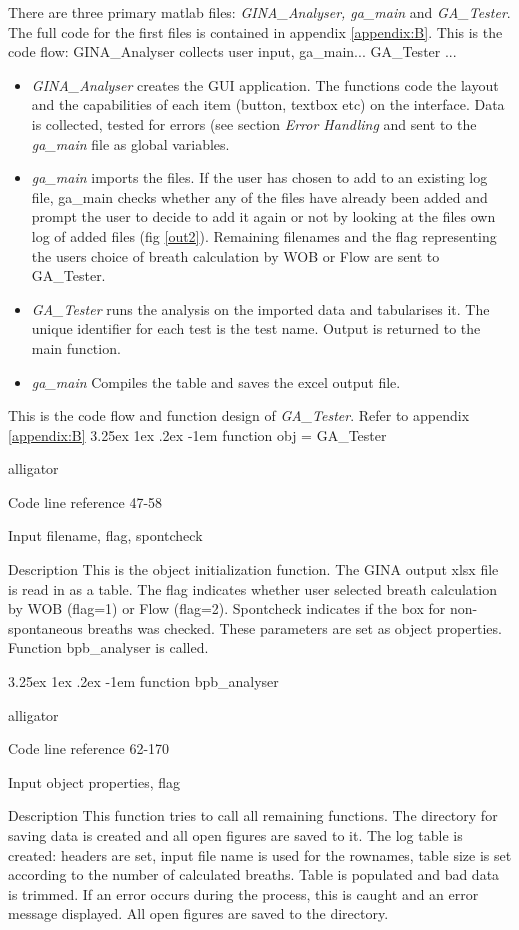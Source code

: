 \documentclass[12pt, openany, oneside]{book}
\makeatletter
\renewcommand\subparagraph{\@startsection{subparagraph}{6}{\parindent}%
  {3.25ex \@plus1ex \@minus .2ex}%
  {-1em}%
  {\normalfont\normalsize\bfseries}}
\makeatother
\begin{document}
There are three primary matlab files: \textit{GINA\_Analyser, ga\_main} and \textit{GA\_Tester}. The full code for the first files is contained in appendix \ref{appendix:B}.
This is the code flow: GINA\_Analyser collects user input, ga\_main... GA\_Tester ... 
\begin{itemize}
	\item \textit{GINA\_Analyser} creates the GUI application. The functions code the layout and the capabilities of each item (button, textbox etc) on the interface. 
Data is collected, tested for errors (see section \textit{Error Handling} and sent to the \textit{ga\_main} file as global variables. 
	\item \textit{ga\_main} imports the files. If the user has chosen to add to an existing log file, ga\_main checks whether any of the files have already been added and prompt the user to decide to add it again or not by looking at the files own log of added files (fig \ref{out2}). Remaining filenames and the flag representing the users choice of breath calculation by WOB or Flow are sent to GA\_Tester.
	\item	\textit{GA\_Tester} runs the analysis on the imported data and tabularises it. The unique identifier for each test is the test name. Output is returned to the main function.
\item \textit{ga\_main} Compiles the table and saves the excel output file. 
\end{itemize}



This is the code flow and function design of \textit{GA\_Tester}. Refer to appendix \ref{appendix:B}
\subparagraph{function obj = GA\_Tester}
\begin{labeling}{alligator}
\item[Code line reference] 47-58
\item[Input] filename, flag, spontcheck
\item[Description] This is the object initialization function. The GINA output xlsx file is read in as a table. The flag indicates whether user selected breath calculation by WOB (flag=1) or Flow (flag=2). Spontcheck indicates if the box for non-spontaneous breaths was checked. These parameters are set as object properties. Function bpb\_analyser is called.
\end{labeling}

\subparagraph{function bpb\_analyser}
\begin{labeling}{alligator}
\item[Code line reference] 62-170
\item[Input] object properties, flag
\item[Description] This function tries to call all remaining functions. The directory for saving data is created and all open figures are saved to it. The log table is created: headers are set, input file name is used for the rownames, table size is set according to the number of calculated breaths. Table is populated and bad data is trimmed. If an error occurs during the process, this is caught and an error message displayed. All open figures are saved to the directory.
\end{labeling}
\end{document}
